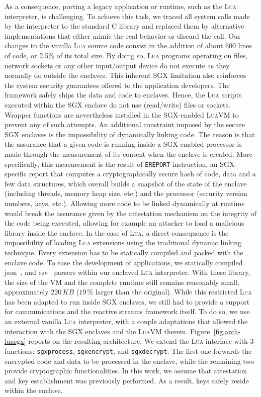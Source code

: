 As a consequence, porting a legacy application or runtime, such as the \textsc{Lua} interpreter, is challenging.
To achieve this task, we traced all system calls made by the interpreter to the standard C library and replaced them by alternative implementations that either mimic the real behavior or discard the call.
Our changes to the vanilla \textsc{Lua} source code consist in the addition of about $600$ lines of code, or 2.5\% of its total size.
By doing so, \textsc{Lua} programs operating on files, network sockets or any other input/output device do not execute as they normally do outside the enclaves.
This inherent SGX limitation also reinforces the system security guarantees offered to the application developers.
The \SYS{} framework safely ships the data and code to enclaves.
Hence, the \textsc{Lua} scripts executed within the SGX enclave do not use (read/write) files or sockets.
Wrapper functions are nevertheless installed in the SGX-enabled \textsc{LuaVM} to prevent any of such attempts.
% 
An additional constraint imposed by the secure SGX enclaves is the impossibility of dynamically linking code. 
The reason is that the assurance that a given code is running inside a SGX-enabled processor is made through the measurement of its content when the enclave is created.
More specifically, this measurement is the result of \texttt{EREPORT} instruction, an SGX-specific report that computes a cryptographically secure hash of code, data and a few data structures, which overall builds a snapshot of the state of the enclave (including threads, memory heap size, etc.) and the processor (security version numbers, keys, etc.).
Allowing more code to be linked dynamically at runtime would break the assurance given by the attestation mechanism on the integrity of the code being executed, allowing for example an attacker to load a malicious library inside the enclave.
% 
In the case of \textsc{Lua}, a direct consequence is the impossibility of loading \textsc{Lua} extensions using the traditional dynamic linking technique. 
Every extension has to be statically compiled and packed with the enclave code. 
To ease the development of \SYS applications, we statically compiled \textsf{json}~\cite{rfc7159}, and \textsf{csv}~\cite{rfc4180} parsers within our enclaved \textsc{Lua} interpreter.
With these library, the size of the VM and the complete runtime still remains reasonably small, approximately $220\,KB$ ($19\,\%$ larger than the original).
% 
While this restricted \textsc{Lua} has been adapted to run inside SGX enclaves, we still had to provide a support for communications and the reactive streams framework itself.
To do so, we use an external vanilla \textsc{Lua} interpreter, with a couple adaptations that allowed the interaction with the SGX enclaves and the \textsc{LuaVM} therein.
Figure~\ref{fig:arch-luasgx} reports on the resulting architecture.
We extend the \textsc{Lua} interface with 3 functions: \texttt{sgxprocess}, \texttt{sgxencrypt}, and \texttt{sgxdecrypt}. 
The first one forwards the encrypted code and data to be processed in the enclave, while the remaining two provide cryptographic functionalities.
In this work, we assume that attestation and key establishment was previously performed.
As a result, keys safely reside within the enclave.
